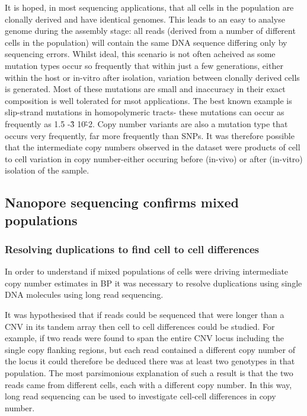 \documentclass{article}
\begin{document}

It is hoped, in most sequencing applications, that all cells in the population are clonally derived and have identical genomes. This leads to an easy to analyse genome during the assembly stage: all reads (derived from a number of different cells in the population) will contain the same DNA sequence differing only by sequencing errors. Whilst ideal, this scenario is not often acheived as some mutation types occur so frequently that within just a few generations, either within the host or in-vitro after isolation, variation between clonally derived cells is generated. Most of these mutations are small and inaccuracy in their exact composition  is well tolerated for msot applications. The best known example is slip-strand mutations in homopolymeric tracts- these mutations can occur as frequently as 1.5 -\^ 3 10\^-2. Copy number variants are also a mutation type that occurs very frequently, far more frequently than SNPs. It was therefore possible that the intermediate copy numbers observed in the dataset were products of cell to cell variation in copy number-either occuring before (in-vivo) or after (in-vitro) isolation of the sample. 
 


\subsection{Nanopore sequencing confirms mixed populations}

\subsubsection{Resolving duplications to find cell to cell differences}
In order to understand if mixed populations of cells were driving intermediate copy number estimates in BP it was necessary to resolve duplications using single DNA molecules using long read sequencing. 

It was hypothesised that if reads could be sequenced that were longer than a CNV in its tandem array then cell to cell differences could be studied. For example, if two reads were found to span the entire CNV locus including the single copy flanking regions, but each read contained a different copy number of the locus it could therefore be deduced there was at least two genotypes in that population. The most parsimonious explanation of such a result is that the two reads came from different cells, each with a different copy number. In this way, long read sequencing can be used to investigate cell-cell differences in copy number.
\end{document}
